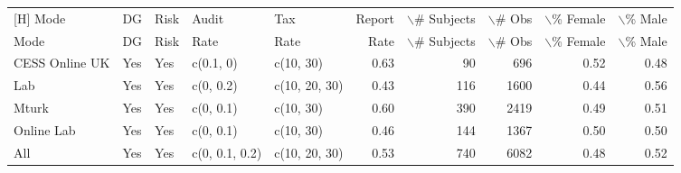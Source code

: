 \begin{tabular}{lllllrrrrr}[H]
	\centering \scriptsize
  \hline
Mode & DG & Risk & Audit  & Tax  & Report  & $\backslash$\# Subjects & $\backslash$\# Obs & $\backslash$\% Female & $\backslash$\% Male \\ 
Mode & DG & Risk &  Rate &  Rate &  Rate & $\backslash$\# Subjects & $\backslash$\# Obs & $\backslash$\% Female & $\backslash$\% Male \\ 
  \hline
CESS Online UK & Yes & Yes & c(0.1, 0) & c(10, 30) & 0.63 &  90 & 696 & 0.52 & 0.48 \\ 
  Lab & Yes & Yes & c(0, 0.2) & c(10, 20, 30) & 0.43 & 116 & 1600 & 0.44 & 0.56 \\ 
  Mturk & Yes & Yes & c(0, 0.1) & c(10, 30) & 0.60 & 390 & 2419 & 0.49 & 0.51 \\ 
  Online Lab & Yes & Yes & c(0, 0.1) & c(10, 30) & 0.46 & 144 & 1367 & 0.50 & 0.50 \\ 
  All & Yes & Yes & c(0, 0.1, 0.2) & c(10, 20, 30) & 0.53 & 740 & 6082 & 0.48 & 0.52 \\ 
   \hline
\end{tabular}
